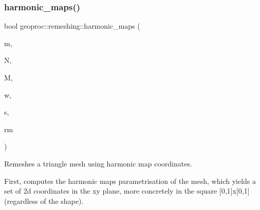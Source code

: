 \subsubsection{\texorpdfstring{harmonic\+\_\+maps()}{harmonic\_maps()}\hspace{0.1cm}{\footnotesize\ttfamily [1/4]}}
{\footnotesize\ttfamily bool geoproc\+::remeshing\+::harmonic\+\_\+maps (\begin{DoxyParamCaption}\item[{const \hyperlink{classgeoproc_1_1TriangleMesh}{Triangle\+Mesh} \&}]{m,  }\item[{size\+\_\+t}]{N,  }\item[{size\+\_\+t}]{M,  }\item[{const \hyperlink{namespacegeoproc_a12e5a10581b53b9dd9a509127527f843}{weight} \&}]{w,  }\item[{const \hyperlink{namespacegeoproc_a494da744a805b80f842402f0a806ccfc}{boundary\+\_\+shape} \&}]{s,  }\item[{\hyperlink{classgeoproc_1_1TriangleMesh}{Triangle\+Mesh} \&}]{rm }\end{DoxyParamCaption})}



Remeshes a triangle mesh using harmonic map coordinates. 

First, computes the harmonic maps parametrisation of the mesh, which yields a set of 2d coordinates in the xy plane, more concretely in the square \mbox{[}0,1\mbox{]}x\mbox{[}0,1\mbox{]} (regardless of the shape).

